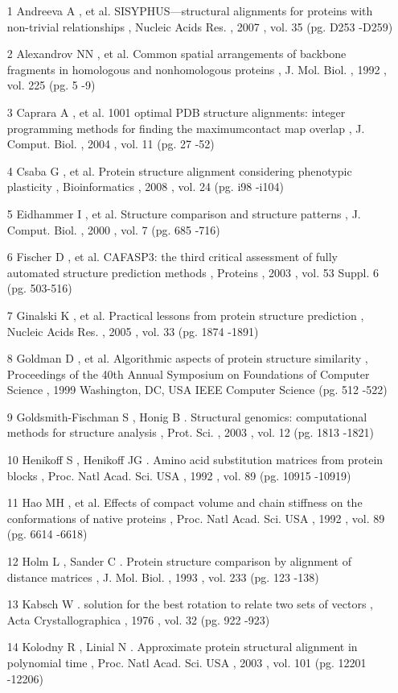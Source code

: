 \documentclass[a4paper]{extreport}
\begin{document}
\begin{itemize}
\item[1] Andreeva
A
, et al. 
SISYPHUS—structural alignments for proteins with non-trivial relationships
, Nucleic Acids Res.
 , 2007
, vol. 35
 (pg. D253
-D259)
\item[2]Alexandrov
NN
, et al. 
Common spatial arrangements of backbone fragments in homologous and nonhomologous proteins
, J. Mol. Biol.
 , 1992
, vol. 225
 (pg. 5
-9)
\item[3]Caprara
A
, et al. 
1001 optimal PDB structure alignments: integer programming methods for finding the maximumcontact map overlap
, J. Comput. Biol.
 , 2004
, vol. 11
 (pg. 27
-52)
\item[4]Csaba
G
, et al. 
Protein structure alignment considering phenotypic plasticity
, Bioinformatics
 , 2008
, vol. 24
 (pg. i98
-i104)
\item[5]Eidhammer
I
, et al. 
Structure comparison and structure patterns
, J. Comput. Biol.
 , 2000
, vol. 7
 (pg. 685
-716)
\item[6]Fischer
D
, et al. 
CAFASP3: the third critical assessment of fully automated structure prediction methods
, Proteins
 , 2003
, vol. 53
 Suppl. 6
(pg. 503-516)
\item[7] Ginalski
K
, et al. 
Practical lessons from protein structure prediction
, Nucleic Acids Res.
 , 2005
, vol. 33
 (pg. 1874
-1891)
\item[8] Goldman
D
, et al. 
Algorithmic aspects of protein structure similarity
, Proceedings of the 40th Annual Symposium on Foundations of Computer Science
 , 1999
Washington, DC, USA
IEEE Computer Science
(pg. 512
-522)
\item[9] Goldsmith-Fischman
S
,  Honig
B
. 
Structural genomics: computational methods for structure analysis
, Prot. Sci.
 , 2003
, vol. 12
 (pg. 1813
-1821)
\item[10]Henikoff
S
,  Henikoff
JG
. 
Amino acid substitution matrices from protein blocks
, Proc. Natl Acad. Sci. USA
 , 1992
, vol. 89
 (pg. 10915
-10919)
\item[11]Hao
MH
, et al. 
Effects of compact volume and chain stiffness on the conformations of native proteins
, Proc. Natl Acad. Sci. USA
 , 1992
, vol. 89
 (pg. 6614
-6618)
\item[12] Holm
L
,  Sander
C
. 
Protein structure comparison by alignment of distance matrices
, J. Mol. Biol.
 , 1993
, vol. 233
 (pg. 123
-138)
\item[13]Kabsch
W
. 
solution for the best rotation to relate two sets of vectors
, Acta Crystallographica
 , 1976
, vol. 32
 (pg. 922
-923)
\item[14] Kolodny
R
,  Linial
N
. 
Approximate protein structural alignment in polynomial time
, Proc. Natl Acad. Sci. USA
 , 2003
, vol. 101
 (pg. 12201
-12206)
\end{itemize}
\end{document}

